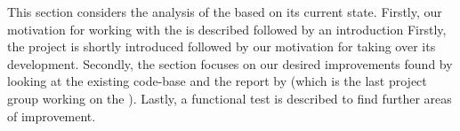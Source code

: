 This section considers the analysis of the \launcher based on its current state.
Firstly, our motivation for working with the \launcher is described followed by an introduction 
Firstly, the \launcher project is shortly introduced followed by our motivation for taking over its development.
Secondly, the section focuses on our desired improvements found by looking at the existing code-base and the report by \citet{launcher2012} (which is the last project group working on the \launcher).
Lastly, a functional test is described to find further areas of improvement.